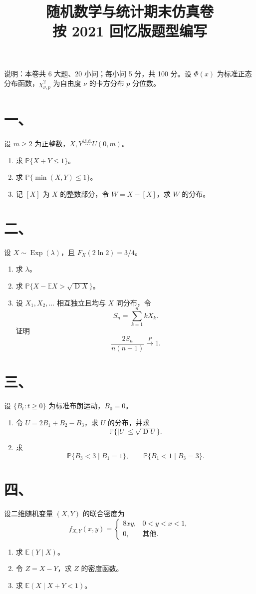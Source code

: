\documentclass[UTF8,zihao=-4,fontset=windows]{ctexart}
\title{\vspace{-1.2cm}随机数学与统计期末仿真卷\\{\large 按 2021 回忆版题型编写}}
\date{}
\newcommand{\Prob}{\mathbb P}
\newcommand{\EX}{\mathbb E}
\newcommand{\DD}{\operatorname D}
\newcommand{\iid}{\overset{\mathrm{i.i.d.}}{\sim}}
\begin{document}
\maketitle
\vspace{-1.6em}

说明：本卷共 6 大题、20 小问；每小问 5 分，共 100 分。设 $\Phi(x)$ 为标准正态分布函数，$\chi^2_{\nu,p}$ 为自由度 $\nu$ 的卡方分布 $p$ 分位数。

\section*{一、}
设 $m\ge 2$ 为正整数，$X,Y \iid U(0,m)$。
\begin{enumerate}
  \item 求 $\Prob\{X+Y\le 1\}$。
  \item 求 $\Prob\{\min(X,Y)\le 1\}$。
  \item 记 $[X]$ 为 $X$ 的整数部分，令 $W=X-[X]$，求 $W$ 的分布。
\end{enumerate}

\section*{二、}
设 $X\sim \operatorname{Exp}(\lambda)$，且 $F_X(2\ln 2)=3/4$。
\begin{enumerate}
  \item 求 $\lambda$。
  \item 求 $\Prob\{X-\EX X>\sqrt{\DD X}\}$。
  \item 设 $X_1,X_2,\ldots$ 相互独立且均与 $X$ 同分布，令
  \[
    S_n=\sum_{k=1}^n kX_k.
  \]
  证明
  \[
    \frac{2S_n}{n(n+1)}\xrightarrow{P}1.
  \]
\end{enumerate}

\section*{三、}
设 $\{B_t:t\ge 0\}$ 为标准布朗运动，$B_0=0$。
\begin{enumerate}
  \item 令 $U=2B_1+B_2-B_3$，求 $U$ 的分布，并求
  \[
    \Prob\{|U|\le \sqrt{\DD U}\}.
  \]
  \item 求
  \[
    \Prob\{B_3<3\mid B_1=1\},\qquad
    \Prob\{B_1<1\mid B_3=3\}.
  \]
\end{enumerate}

\section*{四、}
设二维随机变量 $(X,Y)$ 的联合密度为
\[
  f_{X,Y}(x,y)=
  \begin{cases}
    8xy, & 0<y<x<1,\\
    0, & \text{其他}.
  \end{cases}
\]
\begin{enumerate}
  \item 求 $\EX(Y\mid X)$。
  \item 令 $Z=X-Y$，求 $Z$ 的密度函数。
  \item 求 $\EX(X\mid X+Y<1)$。
\end{enumerate}
\end{document}

